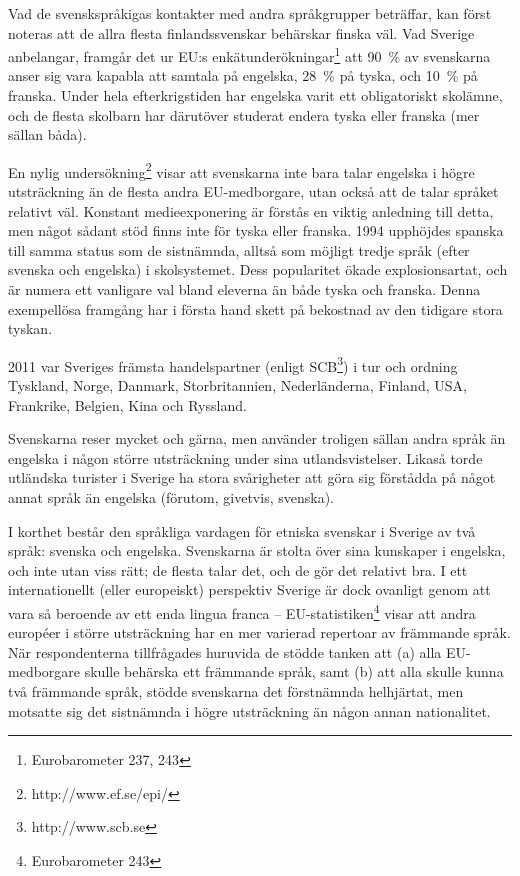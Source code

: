\begin{multicols}{2}
Vad de svenskspråkigas kontakter med andra språkgrupper beträffar, kan
först noteras att de allra flesta finlandssvenskar behärskar finska
väl. Vad Sverige anbelangar, framgår det ur EU:s
enkätunderökningar\footnote{Eurobarometer 237, 243} att 90~\% av
svenskarna anser sig vara kapabla att samtala på engelska, 28~\% på
tyska, och 10~\% på franska. Under hela efterkrigstiden har engelska
varit ett obligatoriskt skolämne, och de flesta skolbarn har därutöver
studerat endera tyska eller franska (mer sällan båda). 


En nylig
undersökning\footnote{http://www.ef.se/epi/ } visar att svenskarna
inte bara talar engelska i högre utsträckning än de flesta andra
EU-medborgare, utan också att de talar språket relativt väl. Konstant
medie\-expo\-nering är förstås en viktig anledning till detta, men något
sådant stöd finns inte för tyska eller franska. 1994 upphöjdes spanska
till samma status som de sistnämnda, alltså som möjligt tredje språk
(efter svenska och engelska) i skolsystemet. Dess popularitet ökade
explosionsartat, och är numera ett vanligare val bland eleverna än
både tyska och franska. Denna exempellösa framgång har i första hand
skett på bekostnad av den tidigare stora tyskan.

2011 var Sveriges främsta handelspartner (enligt
SCB\footnote{http://www.scb.se }) i tur och ordning Tyskland, Norge,
Dan\-mark, Storbritannien, Nederländerna, Finland, USA, Frankrike,
Belgien, Kina och Ryssland.

Svenskarna reser mycket och gärna, men använder troligen sällan andra
språk än engelska i någon större utsträckning under sina
utlandsvistelser. Likaså torde utländska turister i Sverige ha stora
svårigheter att göra sig förstådda på något annat språk än engelska
(förutom, givetvis, svenska).

I korthet består den språkliga vardagen för etniska svenskar i Sverige
av två språk: svenska och engelska. Svenskarna är stolta över sina
kunskaper i engelska, och inte utan viss rätt; de flesta talar det,
och de gör det relativt bra. I ett internationellt (eller europeiskt)
perspektiv Sverige är dock ovanligt genom att vara så beroende av ett
enda lingua franca -- EU-statistiken\footnote{Eurobarometer 243} visar
att andra européer i större utsträckning har en mer varierad repertoar
av främmande språk. När respondenterna tillfrågades huruvida de stödde
tanken att (a) alla EU-medborgare skulle behärska ett främmande språk,
samt (b) att alla skulle kunna två främmande språk, stödde svenskarna
det förstnämnda helhjärtat, men motsatte sig det sistnämnda i högre
utsträckning än någon annan nationalitet.


\end{multicols}
